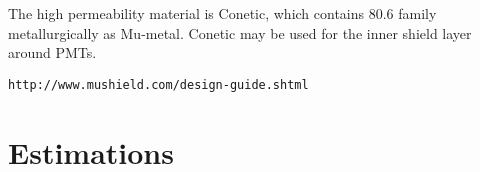 \documentclass[12pt]{article}
\begin{document}
The high permeability material is Conetic, 
which contains 80.6%
family metallurgically as Mu-metal.
 Conetic may be  used for the inner  shield layer around PMTs.










\verb|http://www.mushield.com/design-guide.shtml|

\section{Estimations}
\end{document}
